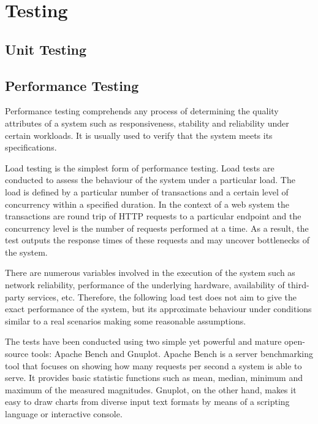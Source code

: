 \chapter{Testing}

\section{Unit Testing}

\section{Performance Testing}

Performance testing comprehends any process of determining the quality attributes of a system such as responsiveness, stability and reliability under certain workloads. It is usually used to verify that the system meets its specifications.

Load testing is the simplest form of performance testing. Load tests are conducted to assess the behaviour of the system under a particular load. The load is defined by a particular number of transactions and a certain level of concurrency within a specified duration. In the context of a web system the transactions are round trip of HTTP requests to a particular endpoint and the concurrency level is the number of requests performed at a time. As a result, the test outputs the response times of these requests and may uncover bottlenecks of the system.

There are numerous variables involved in the execution of the system such as network reliability, performance of the underlying hardware, availability of third-party services, etc. Therefore, the following load test does not aim to give the exact performance of the system, but its approximate behaviour under conditions similar to a real scenarios making some reasonable assumptions.

The tests have been conducted using two simple yet powerful and mature open-source tools: Apache Bench and Gnuplot. Apache Bench is a server benchmarking tool that focuses on showing how many requests per second a system is able to serve. It provides basic statistic functions such as mean, median, minimum and maximum of the measured magnitudes. Gnuplot, on the other hand, makes it easy to draw charts from diverse input text formats by means of a scripting language or interactive console.


